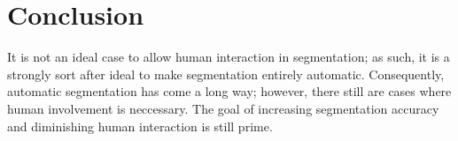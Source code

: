 \section{Conclusion}
\label{sec:interactive_conclusion}

It is not an ideal case to allow human interaction in segmentation; as such, it is a strongly sort after ideal to make segmentation entirely automatic. Consequently, automatic segmentation has come a long way; however, there still are cases where human involvement is neccessary. The goal of increasing segmentation accuracy and diminishing human interaction is still prime.

